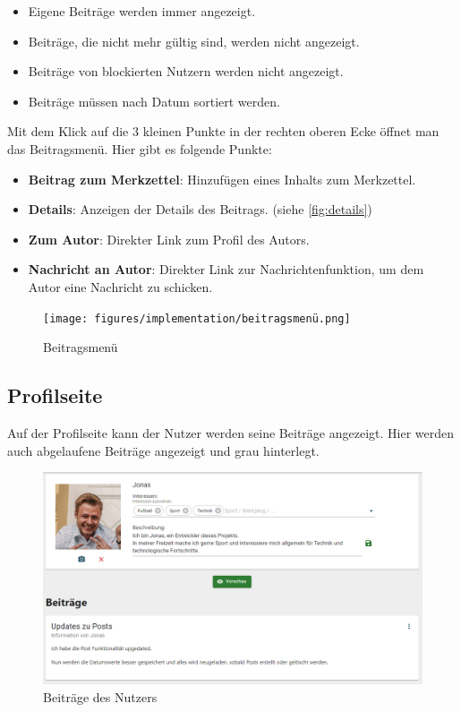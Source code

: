 \begin{itemize}
  \item Eigene Beiträge werden immer angezeigt.
  \item Beiträge, die nicht mehr gültig sind, werden nicht angezeigt.
  \item Beiträge von blockierten Nutzern werden nicht angezeigt.
  \item Beiträge müssen nach Datum sortiert werden.
\end{itemize}

Mit dem Klick auf die 3 kleinen Punkte in der rechten oberen Ecke öffnet man das Beitragsmenü. Hier gibt es folgende Punkte:

\begin{itemize}
  \item \textbf{Beitrag zum Merkzettel}: Hinzufügen eines Inhalts zum Merkzettel.
  \item \textbf{Details}: Anzeigen der Details des Beitrags. (siehe \ref{fig:details})
  \item \textbf{Zum Autor}: Direkter Link zum Profil des Autors.
  \item \textbf{Nachricht an Autor}: Direkter Link zur Nachrichtenfunktion, um dem Autor eine Nachricht zu schicken.
\end{itemize}

\begin{figure}[ht!]
  \begin{centering}
    \texttt{[image: figures/implementation/beitragsmenü.png]}
    \caption{Beitragsmenü}
    \label{fig:beitragsmenü}
  \end{centering}
\end{figure}

\clearpage
\subsection{Profilseite}
\label{sec:profilepage}

Auf der Profilseite kann der Nutzer werden seine Beiträge angezeigt.
Hier werden auch abgelaufene Beiträge angezeigt und grau hinterlegt.

\begin{figure}[ht!]
  \begin{centering}
    \includegraphics[width=1\textwidth]{figures/implementation/userposts.png}
    \caption{Beiträge des Nutzers}
    \label{fig:userposts}
  \end{centering}
\end{figure}

